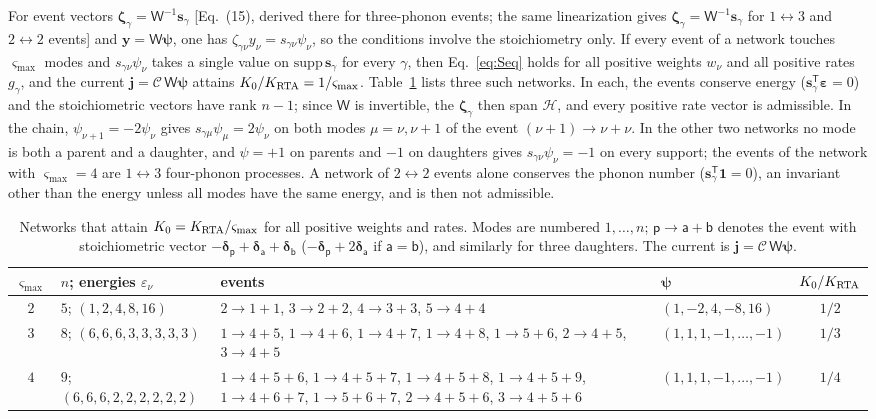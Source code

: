 \documentclass[aps,prb,10pt,onecolumn,amsmath,amssymb,superscriptaddress,nofootinbib]{revtex4-2}
\theoremstyle{plain}
\newcommand{\tr}{^{\mathsf T}}
\newcommand{\Cop}{\mathcal C}
\newcommand{\Hsp}{\mathcal H}
\newcommand{\jj}{\mathbf j}
\newcommand{\yy}{\mathbf y}
\begin{document}
For event vectors $\bm\zeta_\gamma=\mathsf W^{-1}\mathbf s_\gamma$ [Eq.~(15), derived there for three-phonon events; the same linearization gives $\bm\zeta_\gamma=\mathsf W^{-1}\mathbf s_\gamma$ for $1\leftrightarrow3$ and $2\leftrightarrow2$ events] and $\yy=\mathsf W\bm\psi$, one
has $\zeta_{\gamma\nu}y_\nu=s_{\gamma\nu}\psi_\nu$, so the conditions involve the stoichiometry only. If
every event of a network touches $\varsigma_{\max}$ modes and $s_{\gamma\nu}\psi_\nu$ takes a single value on
$\mathrm{supp}\,\mathbf s_\gamma$ for every $\gamma$, then Eq.~\eqref{eq:Seq} holds for all positive weights
$w_\nu$ and all positive rates $g_\gamma$, and the current $\jj=\Cop\,\mathsf W\bm\psi$ attains
$K_0/K_{\rm RTA}=1/\varsigma_{\max}$. Table~\ref{tab:sharp} lists three such networks. In each, the events
conserve energy ($\mathbf s_\gamma\tr\bm\varepsilon=0$) and the stoichiometric vectors have rank $n-1$; since
$\mathsf W$ is invertible, the $\bm\zeta_\gamma$ then span $\Hsp$, and every positive rate vector is
admissible. In the chain, $\psi_{\nu+1}=-2\psi_\nu$ gives $s_{\gamma\mu}\psi_\mu=2\psi_\nu$ on both modes
$\mu=\nu,\nu+1$ of the event $(\nu+1)\to\nu+\nu$. In the other two networks no mode is both a parent and a
daughter, and $\psi=+1$ on parents and $-1$ on daughters gives $s_{\gamma\nu}\psi_\nu=-1$ on every support;
the events of the network with $\varsigma_{\max}=4$ are $1\leftrightarrow3$ four-phonon processes. A
network of $2\leftrightarrow2$ events alone conserves the phonon number ($\mathbf s_\gamma\tr\mathbf 1=0$),
an invariant other than the energy unless all modes have the same energy, and is then not admissible.

\begin{table}[htbp]
\caption{Networks that attain $K_0=K_{\rm RTA}/\varsigma_{\max}$ for all positive weights and rates. Modes
are numbered $1,\dots,n$; $\mathsf p\to\mathsf a+\mathsf b$ denotes the event with stoichiometric vector
$-\bm\delta_{\mathsf p}+\bm\delta_{\mathsf a}+\bm\delta_{\mathsf b}$ ($-\bm\delta_{\mathsf p}+2\bm\delta_{\mathsf a}$
if $\mathsf a=\mathsf b$), and similarly for three daughters. The current is $\jj=\Cop\,\mathsf W\bm\psi$.}
\label{tab:sharp}
\begin{ruledtabular}
\begin{tabular}{c l p{} l c}
$\varsigma_{\max}$ & $n$; energies $\varepsilon_\nu$ & events & $\bm\psi$ & $K_0/K_{\rm RTA}$\\ \hline
$2$ & $5$; $(1,2,4,8,16)$ & $2\to1+1$, $3\to2+2$, $4\to3+3$, $5\to4+4$ & $(1,-2,4,-8,16)$ & $1/2$\\
$3$ & $8$; $(6,6,6,3,3,3,3,3)$ & $1\to4+5$, $1\to4+6$, $1\to4+7$, $1\to4+8$, $1\to5+6$, $2\to4+5$, $3\to4+5$
& $(1,1,1,-1,\dots,-1)$ & $1/3$\\
$4$ & $9$; $(6,6,6,2,2,2,2,2,2)$ & $1\to4+5+6$, $1\to4+5+7$, $1\to4+5+8$, $1\to4+5+9$, $1\to4+6+7$,
$1\to5+6+7$, $2\to4+5+6$, $3\to4+5+6$ & $(1,1,1,-1,\dots,-1)$ & $1/4$\\
\end{tabular}
\end{ruledtabular}
\end{table}
\end{document}
